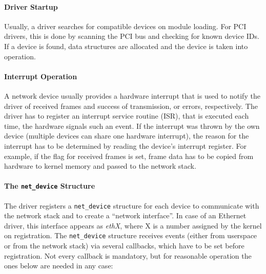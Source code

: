 \documentclass[a4paper,12pt,BCOR6mm,bibtotoc,idxtotoc]{scrbook}
\begin{document}
\paragraph{Driver Startup}

Usually, a driver searches for compatible devices on module loading.
For PCI drivers, this is done by scanning the PCI bus and checking for
known device IDs. If a device is found, data structures are allocated
and the device is taken into operation.

\paragraph{Interrupt Operation}

A network device usually provides a hardware interrupt that is used to
notify the driver of received frames and success of transmission, or
errors, respectively. The driver has to register an interrupt service
routine (ISR),
that is executed each time, the hardware signals such an event. If the
interrupt was thrown by the own device (multiple devices can share one
hardware interrupt), the reason for the interrupt has to be determined
by reading the device's interrupt register. For example, if the flag
for received frames is set, frame data has to be copied from hardware
to kernel memory and passed to the network stack.

\paragraph{The \lstinline+net_device+ Structure}

The driver registers a \lstinline+net_device+ structure for each device to
communicate with the network stack and to create a ``network interface''. In
case of an Ethernet driver, this interface appears as \textit{ethX}, where X
is a number assigned by the kernel on registration. The \lstinline+net_device+
structure receives events (either from userspace or from the network stack)
via several callbacks, which have to be set before registration. Not every
callback is mandatory, but for reasonable operation the ones below are needed
in any case:

\newsavebox\boxopen
\sbox{}
\newsavebox\boxstop
\sbox{}
\newsavebox\boxxmit
\sbox{}
\newsavebox\boxstats
\sbox{}
\end{document}
